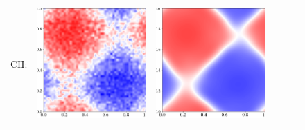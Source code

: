 \documentclass[12pt, reqno]{report}
\theoremstyle{definition}
\theoremstyle{remark}
\begin{document}
\begin{figure}[H]
\begin{tabular}{rccccc}
        CH: &
        \includegraphics[align = c, height=\subheight]{media_paper/CH_cmap_FD_n=0.png} & 
        \includegraphics[align = c, height=\subheight]{media_paper/CH_cmap_FD_n=50.png} & 

\end{tabular}
\end{figure}
\end{document}
